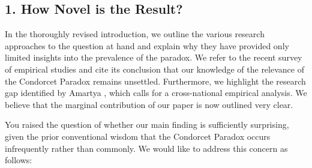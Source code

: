 \documentclass[a4paper, 12pt]{scrartcl}
\begin{document}
\subsection*{1. How Novel is the Result?}
In the thoroughly revised introduction, we outline the various research approaches to the question at hand and explain why they have provided only limited insights into the prevalence of the paradox. We refer to the recent survey of empirical studies \citep{vanDeemen2013} and cite its conclusion that our knowledge of the relevance of the Condorcet Paradox remains unsettled. Furthermore, we highlight the research gap identified by Amartya \cite{Sen2017}, which calls for a cross-national empirical analysis. We believe that the marginal contribution of our paper is now outlined very clear.

You raised the question of whether our main finding is sufficiently surprising, given the prior conventional wisdom that the Condorcet Paradox occurs infrequently rather than commonly. We would like to address this concern as follows:
\end{document}
